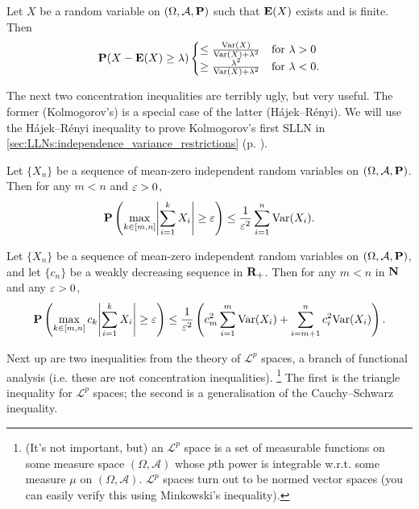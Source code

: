 \documentclass[11pt,letterpaper,reqno,oneside]{article}
\begin{document}
\begin{proposition}
	Let $X$ be a random variable on $(\Omega,\mathcal{A},\mathbf{P})$ such that $\mathbf{E}(X)$ exists and is finite. Then
	\begin{equation*}
		\mathbf{P}( X - \mathbf{E}(X) \geq \lambda ) 
		\begin{cases}
			\leq \frac{\mathrm{Var}(X)}{\mathrm{Var}(X)+\lambda^2} & \text{for $\lambda > 0$} \\
			\geq \frac{\lambda^2}{\mathrm{Var}(X)+\lambda^2} & \text{for $\lambda < 0$} .
		\end{cases} 
	\end{equation*}
\end{proposition}


The next two concentration inequalities are terribly ugly, but very useful. The former (Kolmogorov's) is a special case of the latter (Hájek--Rényi). We will use the Hájek--Rényi inequality to prove Kolmogorov's first SLLN in \cref{sec:LLNs:independence_variance_restrictions} (p. \pageref{sec:LLNs:independence_variance_restrictions}).

\begin{theorem}
	Let $\{ X_n \}$ be a sequence of mean-zero independent random variables on $(\Omega,\mathcal{A},\mathbf{P})$. Then for any $m < n$ and $\varepsilon>0$,
	\begin{equation*}
		\PP\left( \max_{k \in [m,n]} \abs*{\sum_{i=1}^k X_i} \geq \eps \right)
		\leq
		\frac{1}{\eps^2} \sum_{i=1}^n \Var(X_i) .
	\end{equation*}
\end{theorem}


\begin{theorem}
	\label{theorem:Hajek-Renyi_inequality}
	Let $\{ X_n \}$ be a sequence of mean-zero independent random variables on $(\Omega,\mathcal{A},\mathbf{P})$, and let $\{ c_n \}$ be a weakly decreasing sequence in $\mathbf{R}_+$. Then for any $m < n$ in $\mathbf{N}$ and any $\varepsilon>0$,
	\begin{equation*}
		\PP\left( \max_{k \in [m,n]} c_k \abs*{\sum_{i=1}^k X_i} \geq \eps \right)
		\leq \frac{1}{\eps^2} \left( 
		c_m^2 \sum_{i=1}^m \Var(X_i) + \sum_{i=m+1}^n c_i^2 \Var(X_i)
		\right) .
	\end{equation*}
\end{theorem}


Next up are two inequalities from the theory of $\mathcal{L}^p$ spaces, a branch of functional analysis (i.e. these are not concentration inequalities).%
	\footnote{(It's not important, but) an $\mathcal{L}^p$ space is a set of measurable functions on some measure space $(\Omega,\mathcal{A})$ whose $p$th power is integrable w.r.t. some measure $\mu$ on $(\Omega,\mathcal{A})$. $\mathcal{L}^p$ spaces turn out to be normed vector spaces (you can easily verify this using Minkowski's inequality).}
The first is the triangle inequality for $\mathcal{L}^p$ spaces; the second is a generalisation of the Cauchy--Schwarz inequality.
\end{document}
